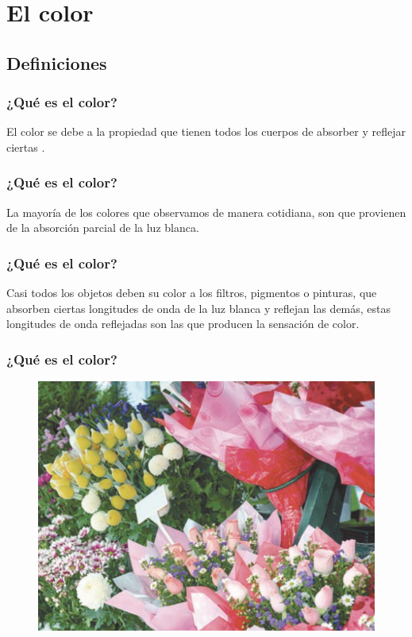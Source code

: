 \documentclass[14pt]{beamer}
\begin{document}
\section{El color}
\subsection{Definiciones}

\begin{frame}
\frametitle{¿Qué es el color?}
El color se debe a la propiedad que tienen todos los cuerpos de absorber y reflejar ciertas .
\end{frame}
\begin{frame}
\frametitle{¿Qué es el color?}
La mayoría de los colores que observamos de manera cotidiana, \pause son  que provienen de la absorción parcial de la luz blanca.
\end{frame}
\begin{frame}
\frametitle{¿Qué es el color?}
Casi todos los objetos deben su color a los filtros, pigmentos o pinturas, que absorben ciertas longitudes de onda de la luz blanca y reflejan las demás, \pause  estas longitudes de onda reflejadas son las que producen la sensación de color.
\end{frame}
\begin{frame}
\frametitle{¿Qué es el color?}
\begin{figure}
    \centering
    \includegraphics[scale=0.6]{Imagenes/Color_01.png}
\end{figure}
\end{frame}
\end{document}
